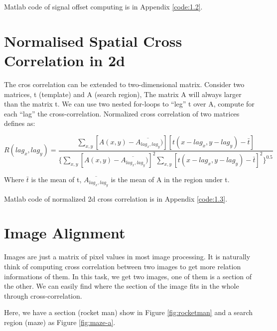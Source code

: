 Matlab code of signal offset computing is in Appendix \ref{code:1.2}.

\section{Normalised Spatial Cross Correlation in 2d}

The cros correlation can be extended to two-dimensional matrix. Consider two matrices, t (template) and A (search region), The matrix A will always larger than the matrix t. We can use two nested for-loops to ``leg'' t over A, compute for each ``lag'' the cross-correlation. Normalized cross correlation of two matrices defines as:

\begin{equation*}
R(lag_{x},lag_{y})=
\frac{\sum_{x,y}[A(x,y)-\overline{A_{lag_{x},lag_{y}}})][t(x-lag_{x},y-lag_{y})-\bar{t}]}
{\{\sum_{x,y}[A(x,y)-\overline{A_{lag_{x},lag_{y}}})]^2
	\sum_{x,y}[t(x-lag_{x},y-lag_{y})-\bar{t}]^2
	\}^{0.5}}
\end{equation*}

Where $\bar{t}$ is the mean of t, $\overline{A_{lag_{x},lag_{y}}}$ is the mean of A in the region under t. 

Matlab code of normalized 2d cross correlation is in Appendix \ref{code:1.3}.

\section{Image Alignment}

Images are just a matrix of pixel values in most image processing. It is naturally think of computing cross correlation between two images to get more relation informations of them. In this task, we get two images, one of them is a section of the other. We can easily find where the section of the image fits in the whole through cross-correlation.

Here, we have a section (rocket man) show in Figure \ref{fig:rocketman} and a search region (maze) as Figure \ref{fig:maze-a}.

